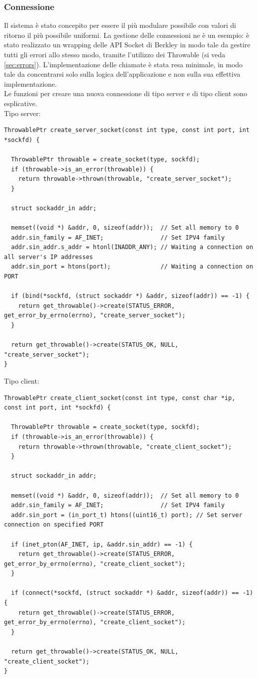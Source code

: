 \documentclass[italian]{tktltiki2}
\begin{document}
\subsubsection*{Connessione}
Il sistema è stato concepito per essere il più modulare possibile con valori di ritorno il più possibile uniformi. La gestione delle connessioni ne è un esempio: è stato realizzato un wrapping delle API Socket di Berkley in modo tale da gestire tutti gli errori allo stesso modo, tramite l'utilizzo dei Throwable (si veda \ref{sec:errors}). L'implementazione delle chiamate è stata resa minimale, in modo tale da concentrarsi solo sulla logica dell'applicazione e non sulla sua effettiva implementazione.
\\
Le funzioni per creare una nuova connessione di tipo server e di tipo client sono esplicative.
\\
Tipo server:
\begin{lstlisting}
ThrowablePtr create_server_socket(const int type, const int port, int *sockfd) {

  ThrowablePtr throwable = create_socket(type, sockfd);
  if (throwable->is_an_error(throwable)) {
    return throwable->thrown(throwable, "create_server_socket");
  }

  struct sockaddr_in addr;

  memset((void *) &addr, 0, sizeof(addr));  // Set all memory to 0
  addr.sin_family = AF_INET;                // Set IPV4 family
  addr.sin_addr.s_addr = htonl(INADDR_ANY); // Waiting a connection on all server's IP addresses
  addr.sin_port = htons(port);              // Waiting a connection on PORT

  if (bind(*sockfd, (struct sockaddr *) &addr, sizeof(addr)) == -1) {
    return get_throwable()->create(STATUS_ERROR, get_error_by_errno(errno), "create_server_socket");
  }

  return get_throwable()->create(STATUS_OK, NULL, "create_server_socket");
}
\end{lstlisting}
Tipo client:
\begin{lstlisting}
ThrowablePtr create_client_socket(const int type, const char *ip, const int port, int *sockfd) {

  ThrowablePtr throwable = create_socket(type, sockfd);
  if (throwable->is_an_error(throwable)) {
    return throwable->thrown(throwable, "create_client_socket");
  }

  struct sockaddr_in addr;

  memset((void *) &addr, 0, sizeof(addr));  // Set all memory to 0
  addr.sin_family = AF_INET;                // Set IPV4 family
  addr.sin_port = (in_port_t) htons((uint16_t) port); // Set server connection on specified PORT

  if (inet_pton(AF_INET, ip, &addr.sin_addr) == -1) {
    return get_throwable()->create(STATUS_ERROR, get_error_by_errno(errno), "create_client_socket");
  }

  if (connect(*sockfd, (struct sockaddr *) &addr, sizeof(addr)) == -1) {
    return get_throwable()->create(STATUS_ERROR, get_error_by_errno(errno), "create_client_socket");
  }

  return get_throwable()->create(STATUS_OK, NULL, "create_client_socket");
}
\end{lstlisting}
\end{document}
